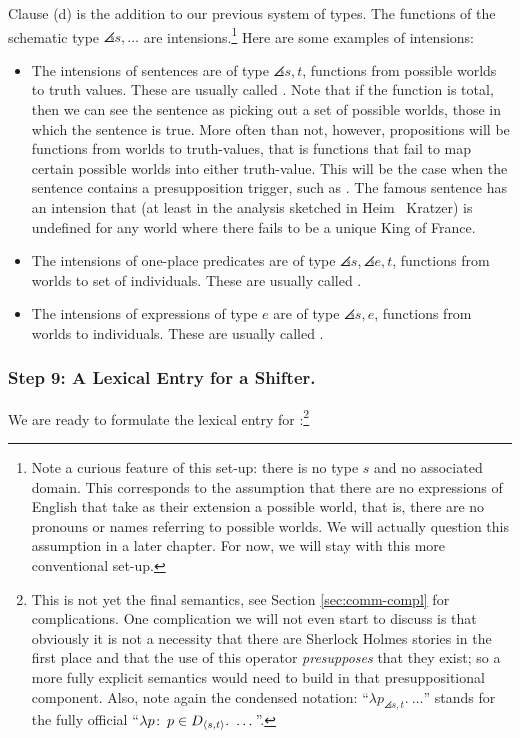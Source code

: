 Clause (d) is the addition to our previous system of types. The
functions of the schematic type $\angles{s,\dots}$ are
intensions.\footnote{Note a curious feature of this set-up: there is
  no type $s$ and no associated domain. This corresponds to the
  assumption that there are no expressions of English that take as
  their extension a possible world, that is, there are no pronouns or
  names referring to possible worlds. We will actually question this
  assumption in a later chapter. For now, we will stay with this more
  conventional set-up.} Here are some examples of intensions:

\begin{itemize}
\item The intensions of sentences are of type $\angles{s,t}$,
  functions from possible worlds to truth values. These are usually
  called . Note that if the function is total, then
  we can see the sentence as picking out a set of possible worlds,
  those in which the sentence is true. More often than not, however,
  propositions will be  functions from worlds to
  truth-values, that is functions that fail to map certain possible
  worlds into either truth-value. This will be the case when the
  sentence contains a presupposition trigger, such as
  . The famous sentence  has an intension that (at least in the analysis sketched
  in Heim \amp\ Kratzer) is undefined for any world where there fails
  to be a unique King of France.
\item The intensions of one-place predicates are of type
  $\angles{s,\angles{e,t}}$, functions from worlds to set of
  individuals. These are usually called .
\item The intensions of expressions of type $e$ are of type
  $\angles{s,e}$, functions from worlds to individuals. These are
  usually called .
\end{itemize}

\subsubsection{Step 9: A Lexical Entry for a Shifter.} \label{sec:lexic-entry-expr}

We are ready to formulate the lexical entry for :\footnote{This is not yet the final
  semantics, see Section \ref{sec:comm-compl} for complications. One
  complication we will not even start to discuss is that obviously it
  is not a necessity that there are Sherlock Holmes stories in the
  first place and that the use of this operator \emph{presupposes}
  that they exist; so a more fully explicit semantics would need to
  build in that presuppositional component. Also, note again the
  condensed notation: ``$\lambda p_{\angles{s,t}}.\ \dots$'' stands
  for the fully official
  ``$\lambda p\colon\thinspace p \in D_{\langle s,t \rangle}.\ \dots$''.}

